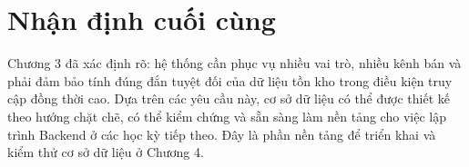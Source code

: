 \section{Nhận định cuối cùng}

Chương 3 đã xác định rõ: hệ thống cần phục vụ nhiều vai trò, nhiều kênh bán và phải đảm bảo tính đúng đắn tuyệt đối của dữ liệu tồn kho trong điều kiện truy cập đồng thời cao. Dựa trên các yêu cầu này, cơ sở dữ liệu có thể được thiết kế theo hướng chặt chẽ, có thể kiểm chứng và sẵn sàng làm nền tảng cho việc lập trình Backend ở các học kỳ tiếp theo. Đây là phần nền tảng để triển khai và kiểm thử cơ sở dữ liệu ở Chương 4.
